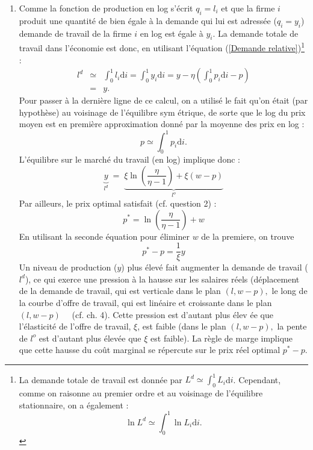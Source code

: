 \documentclass[11pt,a4paper]{article}
\begin{document}
\begin{enumerate}
\item Comme la fonction de production en log s'\'{e}crit $q_{i}=l_{i}$
et que la firme $i$ produit une quantit\'{e} de bien \'{e}gale \`{a} la
demande qui lui est adress\'{e}e ($q_{i}=y_{i}$) demande de travail de la
firme $i$ en log est \'{e}gale \`{a} $y_{i}$. La demande totale de travail
dans l'\'{e}conomie est donc, en utilisant l'\'{e}quation (\ref{Demande
relative})\footnote{%
La demande totale de travail est donn\'{e}e par $L^{d}\simeq
\int_{0}^{1}L_{i}$d$i$. Cependant, comme on raisonne au premier ordre et au
voisinage de l'\'{e}quilibre stationnaire, on a \'{e}galement :%
\begin{equation*}
\ln L^{d}\simeq \int_{0}^{1}\ln L_{i}\text{d}i.
\end{equation*}%
} : 
\begin{eqnarray*}
l^{d} &\simeq &\int_{0}^{1}l_{i}\text{d}i=\int_{0}^{1}y_{i}\text{d}i=y-\eta
\left( \int_{0}^{1}p_{i}\text{d}i-p\right) \\
&=&y.
\end{eqnarray*}%
Pour passer \`{a} la derni\`{e}re ligne de ce calcul, on a utilis\'{e} le
fait qu'on \'{e}tait (par hypoth\`{e}se) au voisinage de l'\'{e}quilibre sym%
\'{e}trique, de sorte que le log du prix moyen est en premi\`{e}re
approximation donn\'{e} par la moyenne des prix en log :%
\begin{equation*}
p\simeq \int_{0}^{1}p_{i}\text{d}i.
\end{equation*}%
L'\'{e}quilibre sur le march\'{e} du travail (en log) implique donc :%
\begin{equation}\label{lm}
\underset{l^{d}}{\underbrace{y}}\;=\;\underset{l^{o}}{\underbrace{\xi \ln
\left( \frac{\eta }{\eta -1}\right) +\xi \left( w-p\right) }}
\end{equation}%
Par ailleurs, le prix optimal satisfait (cf. question 2) : 
\begin{equation}\label{pr}
p^{\ast }=\ln \left( \frac{\eta }{\eta -1}\right) + w
\end{equation}%
En utilisant la seconde \'{e}quation pour \'{e}liminer $w$ de la
premiere, on trouve%
\begin{equation*}
p^{\ast }-p=\frac{1}{\xi }y
\end{equation*}%
Un niveau de production ($y$) plus \'{e}lev\'{e} fait augmenter la demande
de travail ($l^{d}$), ce qui exerce une pression \`{a} la hausse sur les
salaires r\'{e}els (d\'{e}placement de la demande de travail, qui est
verticale dans le plan $\left( l,w-p\right) ,$ le long de la courbe d'offre
de travail, qui est lin\'{e}aire et croissante dans le plan $\left(
l,w-p\right) $ \ \ (cf. ch. 4). Cette pression est d'autant plus \'{e}lev%
\'{e}e que l'\'{e}lasticit\'{e} de l'offre de travail, $\xi $, est faible
(dans le plan $\left( l,w-p\right) ,$ la pente de $l^{o}$ est d'autant plus 
\'{e}lev\'{e}e que $\xi $ est faible). La r\`{e}gle de marge implique que
cette hausse du co\^{u}t marginal se r\'{e}percute sur le prix r\'{e}el
optimal $p^{\ast }-p$.


\end{enumerate}
\end{document}
